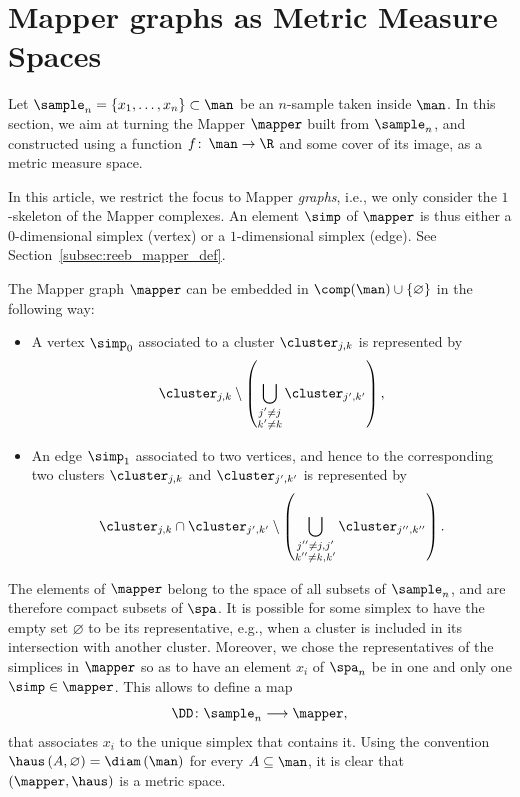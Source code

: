 \section{Mapper graphs as Metric Measure Spaces}\label{sec:mapper_mms}


Let $\sample_n= \{x_1,\dots,x_n\}\subset \man$ be an $n$-sample taken inside $\man$. In this section, we aim at turning the Mapper $\mapper$ built from $\sample_n$, and constructed using a function $f\colon\,\man\rightarrow\R$ and some cover of its image, as a metric measure space. 

In this article, we restrict the focus to Mapper {\em graphs}, i.e., we only consider the $1$-skeleton of the Mapper complexes. 
An element $\simp$ of $\mapper$ is thus either a $0$-dimensional simplex (vertex) or a $1$-dimensional simplex (edge). See Section~\ref{subsec:reeb_mapper_def}. 

The Mapper graph $\mapper$ can be embedded in $\comp(\man)\cup\{\varnothing\}$ in the following way:

 \begin{itemize}
     \item A vertex $\simp_0$ associated to a cluster $\cluster_{j,k}$ is represented by $$\cluster_{j,k}\setminus \left(\bigcup_{\substack{j'\neq j \\k'\neq k}}\cluster_{j',k'}\right),$$
     \item An edge $\simp_1$ associated to two vertices, and hence to the corresponding two clusters $\cluster_{j,k}$ and $\cluster_{j',k'}$ is represented by $$\cluster_{j,k}\cap \cluster_{j',k'}\setminus\left(\bigcup_{\substack{j''\neq j,j' \\k''\neq k,k'}}\cluster_{j'',k''}\right).$$
 \end{itemize}
 
The elements of $\mapper$ belong to the space of all subsets of $\sample_n$, and are therefore compact subsets of $\spa$. It is possible for some simplex to have the empty set $\varnothing$ to be its representative, e.g., when a cluster is included in its intersection with another cluster. 
Moreover, we chose the representatives of the simplices in $\mapper$ so as to have an element $x_i$ of $\spa_n$ be in one and only one $\simp\in\mapper$. This allows to define a map
 $$\DD\colon\sample_n\longrightarrow\mapper,$$
 that associates $x_i$ to the unique simplex that contains it. 
Using the convention
 $ \haus\left(A,\varnothing\right)=\diam\left(\man\right) $ 
 for every $A\subseteq\man$, it is clear that $\left(\mapper,\haus\right)$ is a metric space.

